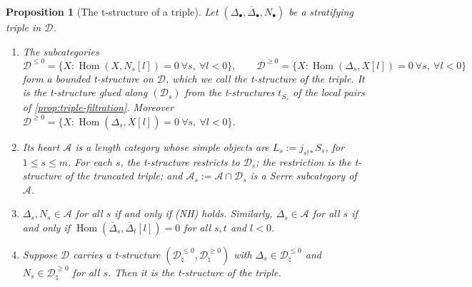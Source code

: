 \documentclass[11pt,reqno]{amsart}
\theoremstyle{plain}
\newtheorem{proposition}[theorem]{Proposition}
\theoremstyle{definition}
\theoremstyle{remark}
\DeclareMathOperator{\Hom}{Hom}
\newcommand{\Deltabar}{\overline{\Delta}}
\newcommand{\cD}{\mathcal{D}}
\newcommand{\cA}{\mathcal{A}}
\begin{document}
\begin{proposition}[The t-structure of a triple]\label{prop:triple-t}
Let $(\Delta_\bullet,\Deltabar_\bullet,N_\bullet)$ be a stratifying triple in $\cD$.
\begin{enumerate}
\item The subcategories
\[\cD^{\le0}=\{X:\Hom(X,N_s[l])=0\ \forall s,\ \forall l<0\},\qquad\cD^{\ge0}=\{X:\Hom(\Delta_s,X[l])=0\ \forall s,\ \forall l<0\}\]
form a bounded t-structure on $\cD$, which we call the \emph{t-structure of the triple}. It is the t-structure glued along $(\cD_s)$ from the t-structures $t_{S_s}$ of the local pairs of \cref{prop:triple-filtration}. Moreover $\cD^{\ge0}=\{X:\Hom(\Deltabar_s,X[l])=0\ \forall s,\ \forall l<0\}$.
\item Its heart $\cA$ is a length category whose simple objects are $L_s:=j_{s!*}S_s$, for $1\le s\le m$. For each $s$, the t-structure restricts to $\cD_s$; the restriction is the t-structure of the truncated triple; and $\cA_s:=\cA\cap\cD_s$ is a Serre subcategory of $\cA$.
\item $\Delta_s,N_s\in\cA$ for all $s$ if and only if (NH) holds. Similarly, $\Deltabar_s\in\cA$ for all $s$ if and only if $\Hom(\Deltabar_s,\Deltabar_t[l])=0$ for all $s,t$ and $l<0$.
\item Suppose $\cD$ carries a t-structure $(\cD_\natural^{\le0},\cD_\natural^{\ge0})$ with $\Delta_s\in\cD_\natural^{\le0}$ and $N_s\in\cD_\natural^{\ge0}$ for all $s$. Then it is the t-structure of the triple.
\end{enumerate}
\end{proposition}
\end{document}
